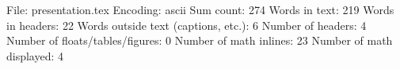 File: presentation.tex
Encoding: ascii
Sum count: 274
Words in text: 219
Words in headers: 22
Words outside text (captions, etc.): 6
Number of headers: 4
Number of floats/tables/figures: 0
Number of math inlines: 23
Number of math displayed: 4

